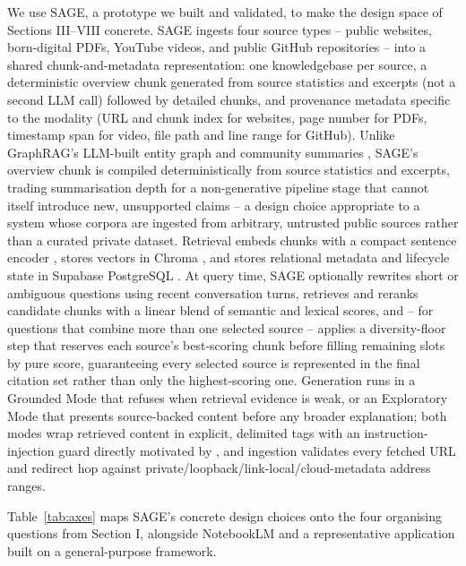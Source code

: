 \documentclass[conference]{IEEEtran}
\begin{document}
We use SAGE, a prototype we built and validated, to make the design
space of Sections III--VIII concrete. SAGE ingests four source types --
public websites, born-digital PDFs, YouTube videos, and public GitHub
repositories -- into a shared chunk-and-metadata representation: one
knowledgebase per source, a deterministic overview chunk generated from
source statistics and excerpts (not a second LLM call) followed by
detailed chunks, and provenance metadata specific to the modality (URL
and chunk index for websites, page number for PDFs, timestamp span for
video, file path and line range for GitHub). Unlike GraphRAG's
LLM-built entity graph and community summaries \cite{edge2024graphrag},
SAGE's overview chunk is compiled deterministically from source
statistics and excerpts, trading summarisation depth for a
non-generative pipeline stage that cannot itself introduce new,
unsupported claims -- a design choice appropriate to a system whose
corpora are ingested from arbitrary, untrusted public sources rather
than a curated private dataset. Retrieval embeds chunks with
a compact sentence encoder \cite{minilm2026}, stores vectors in Chroma
\cite{chroma2026docs}, and stores relational metadata and lifecycle state
in Supabase PostgreSQL \cite{supabase2026docs}. At query time, SAGE
optionally rewrites short or ambiguous questions using recent
conversation turns, retrieves and reranks candidate chunks with a linear
blend of semantic and lexical scores, and -- for questions that combine
more than one selected source -- applies a diversity-floor step that
reserves each source's best-scoring chunk before filling remaining slots
by pure score, guaranteeing every selected source is represented in the
final citation set rather than only the highest-scoring one. Generation
runs in a Grounded Mode that refuses when retrieval evidence is weak, or
an Exploratory Mode that presents source-backed content before any
broader explanation; both modes wrap retrieved content in explicit,
delimited tags with an instruction-injection guard directly motivated by
\cite{greshake2023injection}, and ingestion validates every fetched URL
and redirect hop against private/loopback/link-local/cloud-metadata
address ranges.

Table~\ref{tab:axes} maps SAGE's concrete design choices onto the four
organising questions from Section I, alongside NotebookLM and a
representative application built on a general-purpose framework.
\end{document}
